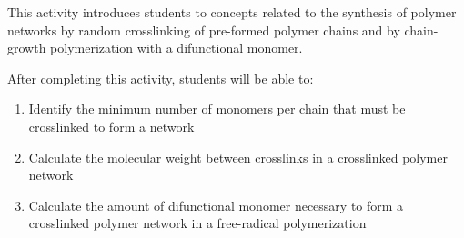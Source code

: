 %
%
%
%

\renewcommand{\figpath}{content/polymchem/networks/network-chaingrowth/figs}
\renewcommand{\labelbase}{network-chaingrowth}

\begin{activity}

\begin{instructornotes}
	This activity introduces students to concepts related to the synthesis of polymer networks by random crosslinking of pre-formed polymer chains and by chain-growth polymerization with a difunctional monomer.
	
	After completing this activity, students will be able to:
	\begin{enumerate}
		\item Identify the minimum number of monomers per chain that must be crosslinked to form a network
		\item Calculate the molecular weight between crosslinks in a crosslinked polymer network
		\item Calculate the amount of difunctional monomer necessary to form a crosslinked polymer network in a free-radical polymerization
	\end{enumerate}
	

\end{instructornotes}
\end{activity}
